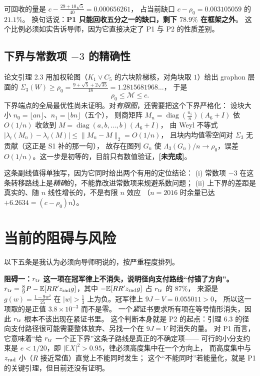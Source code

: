 \documentclass[UTF8,11pt]{ctexart}
\newcommand{\Lam}{\Lambda}
\newcommand{\E}{\mathbb{E}}
\newcommand{\M}{\mathcal{M}}
\DeclareMathOperator{\diag}{diag}
\newcommand{\todo}{\textcolor[rgb]{0.70,0.15,0.10}{\bfseries [未完成]}}
\begin{document}
可回收的量是 $c-\frac{29+10\sqrt5}{40}=0.000656261$，
占当前缺口 $c-\rho_0=0.003105059$ 的 $21.1\%$。
换句话说：\textbf{P1 只能回收五分之一的缺口，剩下 $78.9\%$ 在框架之外}。
这个比例必须如实告诉导师，因为它直接决定了 P1 与 P2 的性质差别。

\subsection{下界与常数项 $-3$ 的精确性}\label{sec:p3}

论文引理 2.3 用加权轮图（$K_1\vee C_5$ 的六块阶梯核，对角块取 $1$）给出 graphon 层面的
$\Sigma_3(W)\ge\rho_0=\frac{9+\sqrt5+2\sqrt{35}}{18}=1.2815681968\ldots$，
于是
\[
 \rho_0\le\M\le c .
\]
下界端点的全局最优性尚未证明。对\emph{有限图}，还需要把这个下界严格化：
设块大小 $n_0=\lfloor an\rfloor$、$n_1=\lfloor bn\rfloor$（五个），
则商矩阵 $M_n=\diag(\frac{n_i}n)(A_6+I)$ 依 $O(1/n)$ 收敛到 $M=\diag(a,b,\ldots,b)(A_6+I)$，
由 Weyl 不等式 $|\lambda_i(M_n)-\lambda_i(M)|\le\|M_n-M\|_2=O(1/n)$，
且块内均值零空间对 $\Sigma_3$ 无贡献（这正是 S1 补的那一句），
故存在图列 $G_n$ 使 $\Lam_3(G_n)/n\to\rho_0$，误差 $O(1/n)$。这一步是初等的，目前只有数值验证，\todo。

这条副线值得单独写，因为它同时给出两个有用的定位结论：
(i) 常数项 $-3$ 在这条转移路线上是\emph{精确}的，不能靠改进常数项来规避系数问题；
(ii) 上下界的差距是真实的、随 $n$ 线性增长的，不是有限 $n$ 效应
（$n=2016$ 时余量已达 $+6.2634=(c-\rho_0)n$）。

\section{当前的阻碍与风险}

以下五条是我认为必须向导师明说的，按严重程度排列。

\textbf{阻碍一：$r_{\rm tr}$ 这一项在冠军律上不消失，说明径向支付路线``付错了方向''。}
$r_{\rm tr}=\frac89P-\E[RR'z_{\rm rad}g]$，其中 $-\E[RR'z_{\rm rad}g]$ 占 $r_{\rm tr}$ 的 $87\%$，
来源是 $g(w)=\frac{1-9w^2}{25}$ 在 $|w|>\frac13$ 上为负。冠军律上 $9J-V=0.055011>0$，
所以这一项取的是正值 $3.8\times10^{-3}$ 而不是零。
一个\emph{紧}证书要求所有项在等号情形消失，因此 $r_{\rm tr}$ 根本不该出现在紧证书里。
这个判断本身就是 P2 的起点：引理 6.3 的径向支付路径很可能需要整体放弃、另找一个在 $9J=V$ 时消失的量。
对 P1 而言，它意味着``给 $r_{\rm tr}$ 一个正下界''这条子路线是真正的不确定项——
可行的小分支约束是 $e<1/20$，即 $|\E X|^2>0.95$，律必须高度集中在一个方向上，
而高度集中与 $z_{\rm rad}$ 小（$R$ 接近常值）直觉上不能同时发生；
这个``不能同时''若能量化，就是 P1 的关键引理，但目前还没有证明。
\end{document}
